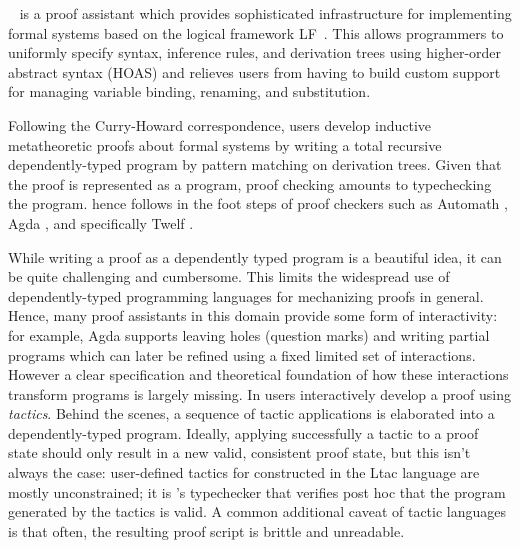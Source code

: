 
\Beluga~\cite{Pientka:IJCAR10,Pientka:CADE15} is a proof assistant which
provides sophisticated infrastructure for implementing formal systems based on
the logical framework LF~\cite{Harper93jacm}.
This allows programmers to uniformly specify syntax, inference rules, and
derivation trees using higher-order abstract syntax (HOAS) and relieves users
from having to build custom support for managing variable binding,
renaming, and substitution.

Following the Curry-Howard correspondence, \Beluga{} users develop inductive
metatheoretic proofs about formal systems by writing a total recursive
dependently-typed program by pattern matching on derivation trees.
Given that the proof is represented as a program, proof checking amounts to
typechecking the program.
\Beluga{} hence follows in the foot steps of proof checkers such as Automath
\cite{Nederpelt:94}, Agda \cite{Norell:phd07}, and specifically Twelf
\cite{Pfenning99cade}.

While writing a proof as a dependently typed program is a beautiful idea, it
can be quite challenging and cumbersome.
This limits the widespread use of dependently-typed programming languages for
mechanizing proofs in general.
Hence, many proof assistants in this domain provide some form
of interactivity: for example, Agda \cite{Norell:phd07} supports leaving holes
(question marks) and writing partial programs which can later be refined using a
fixed limited set of interactions.
However a clear specification and theoretical foundation of how these
interactions transform programs is largely missing.
In \Coq{} \cite{bertot/casteran:2004} users interactively develop a proof using
\emph{tactics}.
Behind the scenes, a sequence of tactic applications is elaborated into a
dependently-typed program.
Ideally, applying successfully a tactic to a proof state should only result in a
new valid, consistent proof state, but this isn't always the case: user-defined
tactics for \Coq{} constructed in the Ltac language \cite{Delahaye:LPAR00} are
mostly unconstrained; it is \Coq's typechecker that verifies post hoc that the
program generated by the tactics is valid.
A common additional caveat of tactic languages is that often, the resulting
proof script is brittle and unreadable.

